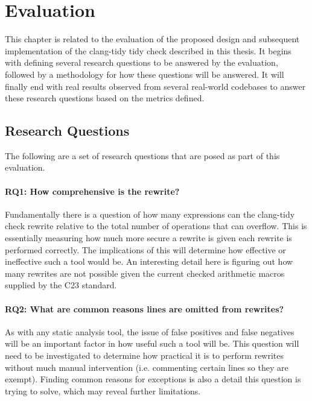 \chapter{Evaluation}
\label{sec:evaluation}

This chapter is related to the evaluation of the proposed design and subsequent implementation of the clang-tidy tidy check described in this thesis. It begins with defining several research questions to be answered by the evaluation, followed by a methodology for how these questions will be answered. It will finally end with real results observed from several real-world codebases to answer these research questions based on the metrics defined.

\section{Research Questions}

The following are a set of research questions that are posed as part of this evaluation.

\subsubsection{\textbf{RQ1: How comprehensive is the rewrite?}}
Fundamentally there is a question of how many expressions can the clang-tidy check rewrite relative to the total number of operations that can overflow. This is essentially measuring how much more secure a rewrite is given each rewrite is performed correctly. The implications of this will determine how effective or ineffective such a tool would be. An interesting detail here is figuring out how many rewrites are not possible given the current checked arithmetic macros supplied by the C23 standard.

\subsubsection{\textbf{RQ2: What are common reasons lines are omitted from rewrites?}}
As with any static analysis tool, the issue of false positives and false negatives will be an important factor in how useful such a tool will be. This question will need to be investigated to determine how practical it is to perform rewrites without much manual intervention (i.e. commenting certain lines so they are exempt). Finding common reasons for exceptions is also a detail this question is trying to solve, which may reveal further limitations.

